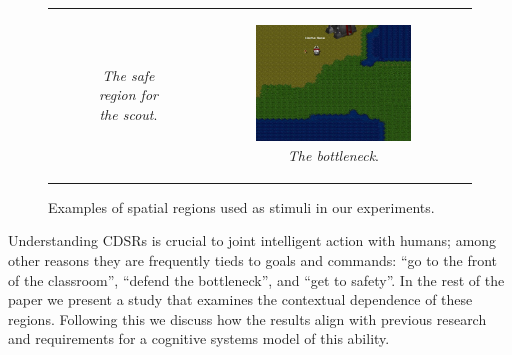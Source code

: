 \documentclass[11pt,letterpaper]{article}
\begin{document}
\begin{figure}
\begin{tabular}{c c c}
\begin{subfigure}[b]{0.32\textwidth}
  \caption{\textit{The safe region for the scout}.}
\end{subfigure} & 
\begin{subfigure}[b]{0.32\textwidth}
  \includegraphics[width=\textwidth]{figures/bottleneck.JPG}
 \caption{\textit{The bottleneck}.}
  \label{fig:safety}
  \end{subfigure}\\
\end{tabular}
  \caption{Examples of spatial regions used as stimuli in our experiments.}
  \label{fig:examples}
\end{figure}

Understanding CDSRs is crucial to joint intelligent action with humans; among other reasons they are frequently tieds to goals and commands: ``go to the front of the classroom'', ``defend the bottleneck'', and ``get to safety''. In the rest of the paper we present a study that examines the contextual dependence of these regions.  Following this we discuss how the results align with previous research and requirements for a cognitive systems model of this ability.
\end{document}
